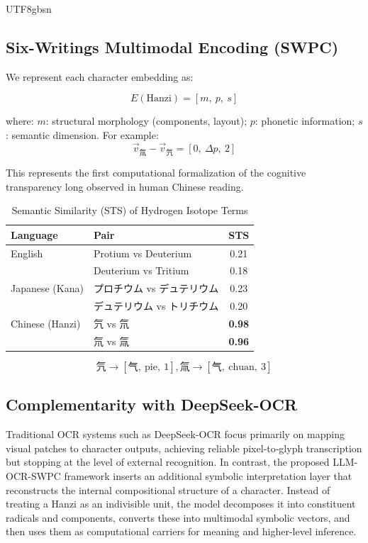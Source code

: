\documentclass[conference]{IEEEtran}
\begin{document}
\begin{CJK*}{UTF8}{gbsn}
\subsection{Six-Writings Multimodal Encoding (SWPC)}

We represent each character embedding as:

\begin{equation}
E(\text{Hanzi}) = [m,~p,~s] 
\end{equation}

where: $m$: structural morphology (components, layout); $p$: phonetic information; $s$: semantic dimension. For example:
\begin{equation}
\vec{v}_{\text{氚}} - \vec{v}_{\text{氕}} = [0,\ \Delta p, \ 2]  
\end{equation}

This represents the first computational formalization of the cognitive transparency long observed in human Chinese reading.

\begin{table}[h]
\centering
\caption{Semantic Similarity (STS) of Hydrogen Isotope Terms}
\label{tab:sts_iso}
\begin{tabular}{|l|l|c|}
\hline
\toprule
\textbf{Language} & \textbf{Pair} & \textbf{STS} \\
\midrule
\hline
English & Protium vs Deuterium & 0.21 \\
        & Deuterium vs Tritium & 0.18 \\
\midrule
\hline
Japanese (Kana) & プロチウム vs デュテリウム & 0.23 \\
                & デュテリウム vs トリチウム & 0.20 \\
\midrule
\hline
Chinese (Hanzi) & 氕 vs 氘 & \textbf{0.98} \\
                & 氘 vs 氚 & \textbf{0.96} \\
\bottomrule
\hline
\end{tabular}
\end{table}

\[
\text{氕} \rightarrow [\text{气}, \ \text{pie}, \ 1], 
\text{氚} \rightarrow [\text{气}, \ \text{chuan}, \ 3]
\]

\subsection{Complementarity with DeepSeek-OCR}

Traditional OCR systems such as DeepSeek-OCR focus primarily on mapping visual patches to character outputs, achieving reliable pixel‐to‐glyph transcription but stopping at the level of external recognition. In contrast, the proposed LLM-OCR-SWPC framework inserts an additional symbolic interpretation layer that reconstructs the internal compositional structure of a character. Instead of treating a Hanzi as an indivisible unit, the model decomposes it into constituent radicals and components, converts these into multimodal symbolic vectors, and then uses them as computational carriers for meaning and higher-level inference. 


\end{CJK*}
\end{document}
